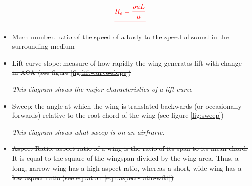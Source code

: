 \documentclass{journal}
\providecommand{\DIFdel}[1]{{\protect\color{red}\sout{#1}}}                      %
\providecommand{\DIFdelFL}[1]{\DIFdel{#1}} %
\begin{document}
\begin{itemize}
\begin{displaymath}
			\DIFdel{\centering
			R_e = \frac{\rho{uL}}{\mu}
		}\end{displaymath}%

\item%
\DIFdel{Mach number: ratio of the speed of a body to the speed of sound in the surrounding medium
		}%
\item%
\DIFdel{Lift curve slope: measure of how rapidly the wing generates lift with change in AOA (see figure \ref{fig:lift-curve-slope})
		}%

{%
\emph{\DIFdelFL{This diagram shows the major characteristics of a lift curve}}%
}

\item%
\DIFdel{Sweep: the angle at which the wing is translated backwards (or occasionally forwards) relative to the root chord of the wing (see figure \ref{fig:sweep})
		}%

{%
\emph{\DIFdelFL{This diagram shows what sweep is on an airframe.}}%
}

\item%
\DIFdel{Aspect Ratio: aspect ratio of a wing is the ratio of its span to its mean chord. It is equal to the square of the wingspan divided by the wing area. Thus, a long, narrow wing has a high aspect ratio, whereas a short, wide wing has a low aspect ratio (see equation \ref{eqn:aspect-ratio-wiki})
		}%


\end{itemize}
\end{document}
